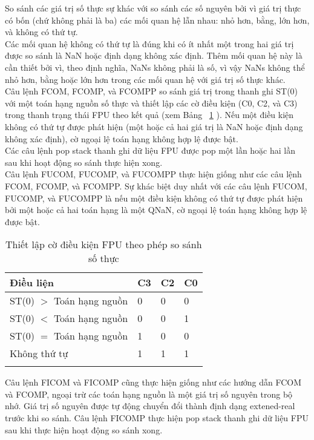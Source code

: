 		So sánh các giá trị số thực sự khác với so sánh các số nguyên bởi vì giá trị thực có bốn (chứ không phải là ba) các mối quan hệ lẫn nhau: nhỏ hơn, bằng, lớn hơn, và không có thứ tự.\\
		
		Các mối quan hệ không có thứ tự là đúng khi có ít nhất một trong hai giá trị được so sánh là NaN hoặc định dạng không xác định. Thêm mối quan hệ này là cần thiết bởi vì, theo định nghĩa, NaNs không phải là số, vì vậy NaNs không thể nhỏ hơn, bằng hoặc lớn hơn trong các mối quan hệ với giá trị số thực khác.\\
		
		Câu lệnh FCOM, FCOMP, và FCOMPP so sánh giá trị trong thanh ghi ST(0) với một toán hạng nguồn số thực và thiết lập các cờ điều kiện (C0, C2, và C3) trong thanh trạng thái FPU theo kết quả (xem Bảng ~\ref{tb:SettingFPU} ). Nếu một điều kiện không có thứ tự được phát hiện (một hoặc cả hai giá trị là NaN hoặc định dạng không xác định), cờ ngoại lệ toán hạng không hợp lệ được bật.\\
		
		Các câu lệnh pop stack thanh ghi dữ liệu FPU được pop một lần hoặc hai lần sau khi hoạt động so sánh thực hiện xong.\\
		
		Câu lệnh FUCOM, FUCOMP, và FUCOMPP thực hiện giống như các câu lệnh FCOM, FCOMP, và FCOMPP. Sự khác biệt duy nhất với các câu lệnh FUCOM, FUCOMP, và FUCOMPP là nếu một điều kiện không có thứ tự được phát hiện bởi một hoặc cả hai toán hạng là một QNaN, cờ ngoại lệ toán hạng không hợp lệ được bật.
		\begin{longtable}{|l|l|l|l|}
			\hline
				Điều liện	& C3 & C2 & C0 \\
			\hline
			\hline
				ST(0) $>$ Toán hạng nguồn & 0 &  0 &  0 \\
			\hline
				ST(0) $<$ Toán hạng nguồn & 0 &  0 &  1 \\
			\hline
				ST(0) $=$ Toán hạng nguồn & 1 &  0 &  0 \\
			\hline
				Không thứ tự & 1 &  1 &  1 \\
			\hline
				\caption{Thiết lập cờ điều kiện FPU theo phép so sánh số thực}
				\label{tb:SettingFPU}
		\end{longtable}	
				
		Câu lệnh FICOM và FICOMP cũng thực hiện giống như các hướng dẫn FCOM và FCOMP, ngoại trừ các toán hạng nguồn là một giá trị số nguyên trong bộ nhớ. Giá trị số nguyên được tự động chuyển đổi thành định dạng extened-real trước khi so sánh. Câu lệnh FICOMP thực hiện pop stack thanh ghi dữ liệu FPU sau khi thực hiện hoạt động so sánh xong.
		
